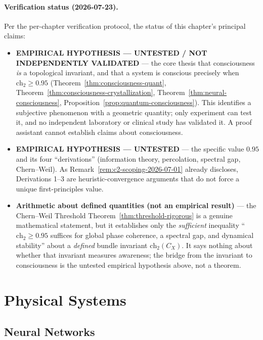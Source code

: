 \paragraph{Verification status (2026-07-23).}
Per the per-chapter verification protocol, the status of this chapter's principal claims:
\begin{itemize}
\item \textbf{EMPIRICAL HYPOTHESIS --- UNTESTED / NOT INDEPENDENTLY VALIDATED} --- the core thesis that consciousness \emph{is} a topological invariant, and that a system is conscious precisely when $\text{ch}_2 \geq 0.95$ (Theorem~\ref{thm:consciousness-quant}, Theorem~\ref{thm:consciousness-crystallization}, Theorem~\ref{thm:neural-consciousness}, Proposition~\ref{prop:quantum-consciousness}). This identifies a subjective phenomenon with a geometric quantity; only experiment can test it, and no independent laboratory or clinical study has validated it. A proof assistant cannot establish claims about consciousness.
\item \textbf{EMPIRICAL HYPOTHESIS --- UNTESTED} --- the specific value $0.95$ and its four ``derivations'' (information theory, percolation, spectral gap, Chern--Weil). As Remark~\ref{rem:c2-scoping-2026-07-01} already discloses, Derivations 1--3 are heuristic-convergence arguments that do not force a unique first-principles value.
\item \textbf{Arithmetic about defined quantities (not an empirical result)} --- the Chern--Weil Threshold Theorem~\ref{thm:threshold-rigorous} is a genuine mathematical statement, but it establishes only the \emph{sufficient} inequality ``$\text{ch}_2 \geq 0.95$ suffices for global phase coherence, a spectral gap, and dynamical stability'' about a \emph{defined} bundle invariant $\text{ch}_2(C_X)$. It says nothing about whether that invariant measures awareness; the bridge from the invariant to consciousness is the untested empirical hypothesis above, not a theorem.
\end{itemize}

\section{Physical Systems}
\label{sec:physical-systems}

\subsection{Neural Networks}

